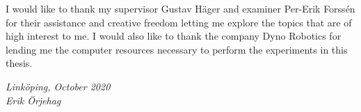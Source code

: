 \begin{acknowledgments}
  I would like to thank my supervisor Gustav Häger and examiner Per-Erik Forssén for their assistance and creative freedom letting me explore the topics that are of high interest to me. I would also like to thank the company Dyno Robotics for lending me the computer resources necessary to perform the experiments in this thesis.

  \addvspace{1em}
  \begin{flushright}
    \textit{%
      Linköping, October 2020\\
      Erik Örjehag%
    }
  \end{flushright}
\end{acknowledgments}
